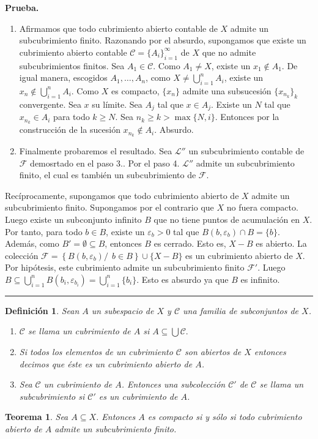 \documentclass[x11names, 12pt]{book}
\newtheorem{definicion}{Definición}
\newtheorem{teorema}{Teorema}
\newenvironment{prueba}[1][Prueba]{\noindent\textbf{#1.} }{\ \rule{0.5em}{0.5em}}
\begin{document}
\begin{prueba}
\begin{enumerate}
    \item Afirmamos que todo cubrimiento abierto contable de $X$ admite un subcubrimiento finito. Razonando por el absurdo, supongamos que existe un cubrimiento abierto contable  $\mathcal{C}=\{A_i\}_{i=1}^\infty$ de $X$ que no admite subcubrimientos finitos. Sea $A_1\in \mathcal{C}$. Como $A_1\neq X$, existe un $x_1 \notin A_1$. De igual manera, escogidos $A_1, \dots , A_n$, como $X\neq \bigcup_{i=1}^n A_i$, existe un $x_n \notin \bigcup_{i=1}^n A_i $. Como $X$ es compacto, $\{x_n\}$ admite una  subsucesión $\{x_{n_k}\}_k$ convergente. Sea $x$ su límite. Sea $A_j$ tal que $x\in A_j$. Existe un $N$ tal que $x_{n_k} \in A_i$ para todo $k\geq N$. Sea $n_k\geq k > \max\{N, i\}$. Entonces por la construcción de la sucesión $x_{n_k}\notin A_i$. Absurdo.
    \item Finalmente probaremos el resultado. Sea $\mathcal{L}''$ un subcubrimiento contable de $\mathcal{F}$ demosrtado en el paso 3.. Por el paso 4. $\mathcal{L}''$ admite un subcubrimiento finito, el cual es también un subcubrimiento de $\mathcal{F}$.
\end{enumerate}
Recíprocamente, supongamos que todo cubrimiento abierto de $X$ admite un subcubrimiento finito. Supongamos por el contrario que $X$ no fuera compacto. Luego existe un subconjunto infinito $B$ que no tiene puntos de acumulación en $X$. Por tanto, para todo $b\in B$, existe un $\varepsilon_b >0$ tal que $B(b, \varepsilon_b ) \cap B=\{b\}$. Además, como $B' =\emptyset \subseteq   B$, entonces $B$ es cerrado. Esto es, $X-B$ es abierto. La colección \linebreak $\mathcal{F}=\left\{ B(b, \varepsilon_b)/ \ \ b\in B \right\}\cup \{X-B\}$ es un cubrimiento abierto de $X$. Por hipótesis, este cubrimiento admite un subcubrimiento finito $\mathcal{F} '$. Luego $B\subseteq \bigcup _{i=1}^n B(b_i , \varepsilon_{b_i})=\bigcup _{i=1}^n \{b_i\}.$ Esto es absurdo ya que $B$ es infinito.
\end{prueba}


\begin{definicion}
Sean $A$ un subespacio de $X$ y $\mathcal{C}$ una familia de subconjuntos de $X$.
\begin{enumerate}
    \item $\mathcal{C}$ se llama un cubrimiento de $A$ si $A \subseteq \bigcup \mathcal{C}.$
    \item Si todos los elementos de un cubrimiento $\mathcal{C}$ son abiertos de $X$ entonces decimos que éste es un cubrimiento abierto de $A$.
    \item Sea $\mathcal{C}$  un cubrimiento de $A$. Entonces  una subcolección  $\mathcal{C}'$ de $\mathcal{C}$ se llama un subcubrimiento si $\mathcal{C}'$ es un cubrimiento de $A$.
\end{enumerate}
\end{definicion}
\begin{teorema}
Sea $A\subseteq X$. Entonces  $A$ es compacto si y sólo si todo cubrimiento abierto de $A$ admite un subcubrimiento finito.
\end{teorema}
\end{document}
